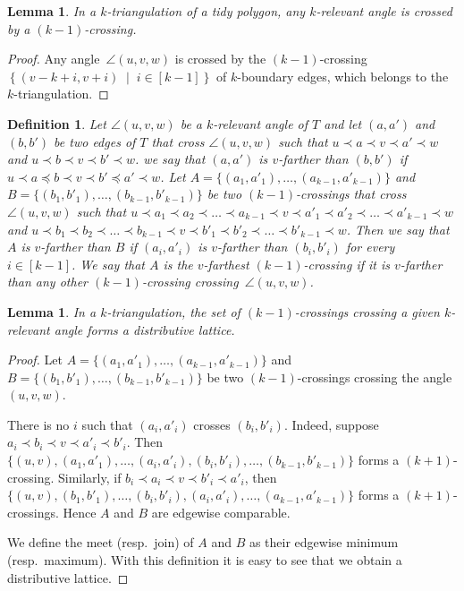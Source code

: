 \documentclass{amsart}
\newtheorem{lemma}[theorem]{Lemma}
\newtheorem{definition}[theorem]{Definition}
\theoremstyle{remark}
\newcommand{\darkblue}{\color{darkblue}} %
\newcommand{\defn}[1]{\textsl{\darkblue #1}} %
\newcommand*{\ktg}[0]{$k$-triangulation\xspace}
\newcommand{\cl}{\prec}
\newcommand{\cle}{\preccurlyeq}
\newcommand{\set}[2]{\left\{ #1 \;\middle|\; #2 \right\}} %
\begin{document}
\begin{lemma}
In a \ktg of a tidy polygon, any $k$-relevant angle is crossed by a $(k-1)$-crossing.
\end{lemma}
\begin{proof}
Any angle~$\angle(u,v,w)$ is crossed by the $(k-1)$-crossing~$\set{(v-k+i, v+i)}{i \in [k-1]}$ of $k$-boundary edges, which belongs to the \ktg.
\end{proof}

\begin{definition}
Let $\angle(u,v,w)$ be a $k$-relevant angle of $T$ and let $(a, a')$ and $(b ,b')$ be two edges of $T$ that cross $\angle(u,v,w)$ such that $u \cl a \cl v \cl a' \cl w$ and $u \cl b \cl v \cl b' \cl w$. we say that $(a, a')$ is \defn{$v$-farther} than $(b, b')$ if $u \cl a \cle b \cl v \cl b' \cle a' \cl w$. Let $A = \{(a_1, a'_1), \dots, (a_{k-1}, a'_{k-1})\}$ and $B = \{(b_1, b'_1), \dots,(b_{k-1}, b'_{k-1})\}$ be two $(k-1)$-crossings that cross $\angle(u,v,w)$ such that $u \cl a_1 \cl a_2 \cl \dots \cl a_{k-1} \cl v \cl a'_1 \cl a'_2 \cl \dots \cl a'_{k-1} \cl w$ and $u \cl b_1 \cl b_2 \cl \dots \cl b_{k-1} \cl v \cl b'_1 \cl b'_2 \cl \dots \cl b'_{k-1} \cl w$. Then we say that $A$ is \defn{$v$-farther} than $B$ if $(a_i, a'_i)$ is $v$-farther than $(b_i, b'_i)$ for every $i \in [k-1]$. We say that $A$ is the \defn{$v$-farthest} $(k-1)$-crossing if it is $v$-farther than any other $(k-1)$-crossing crossing~$\angle(u,v,w)$.
\end{definition}

\begin{lemma}
In a \ktg, the set of $(k-1)$-crossings crossing a given $k$-relevant angle forms a distributive lattice.
\end{lemma}
\begin{proof}
Let $A = \{(a_1, a'_1), \dots, (a_{k-1}, a'_{k-1})\}$ and $B = \{(b_1, b'_1), \dots,(b_{k-1}, b'_{k-1})\}$ be two $(k-1)$-crossings crossing the angle $(u,v,w)$.

There is no $i$ such that $(a_i, a'_i)$ crosses $(b_i, b'_i)$. 
Indeed, suppose $a_i \cl b_i \cl v \cl a'_i \cl b'_i$. Then $\{(u, v), (a_1, a'_1), \dots, (a_i, a'_i), (b_i, b'_i), \dots, (b_{k-1}, b'_{k-1})\}$ forms a $(k+1)$-crossing. 
Similarly, if $b_i \cl a_i \cl v \cl b'_i \cl a'_i$, then $\{(u, v), (b_1, b'_1), \dots, (b_i, b'_i), (a_i, a'_i), \dots, (a_{k-1}, a'_{k-1})\}$ forms a $(k+1)$-crossings.
Hence $A$ and $B$ are edgewise comparable.

We define the meet (resp.~join) of $A$ and $B$ as their edgewise minimum (resp.~maximum). With this definition it is easy to see that we obtain a distributive lattice.
\end{proof}
\end{document}
